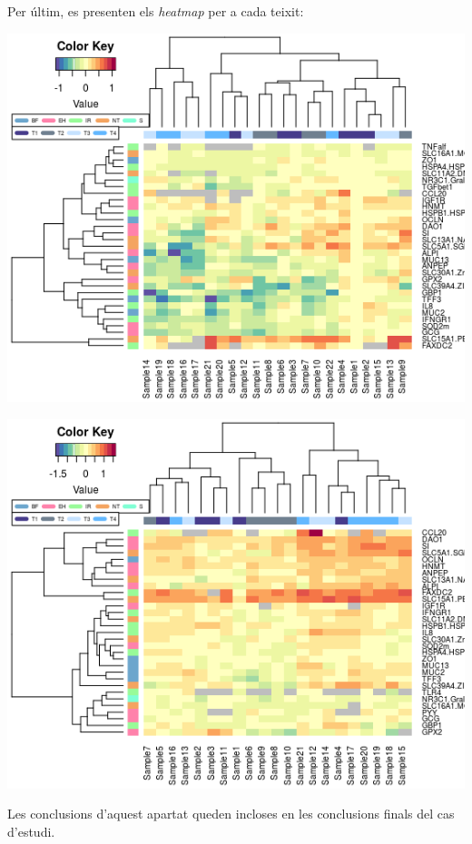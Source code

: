 \documentclass[english]{article}
\begin{document}
Per últim, es presenten els \textit{heatmap} per a cada teixit:
\begin{center}
\includegraphics[scale=0.6]{heatmapi.png}
\end{center}
\begin{center}
\includegraphics[scale=0.6]{heatmapj.png}
\end{center}

Les conclusions d'aquest apartat queden incloses en les conclusions finals del cas d'estudi.
\clearpage
\end{document}
